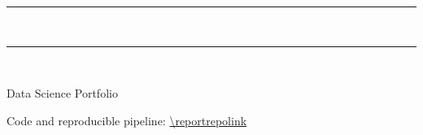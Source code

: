 \begin{titlepage}
    \centering
    \vspace*{2.5cm}

    {\color{accentlight}\rule{\linewidth}{1.4pt}}\\[0.4cm]
    {\Huge\bfseries\color{accent} \reporttitle\par}
    \vspace{0.4cm}
    {\Large\color{muted} \reportsubtitle\par}
    \vspace{0.3cm}
    {\color{accentlight}\rule{\linewidth}{1.4pt}}\\[2cm]

    {\large \reportauthor\par}
    \vspace{0.2cm}
    {\normalsize\color{muted} Data Science Portfolio\par}
    \vspace{0.2cm}
    {\normalsize\color{muted} \reportdate\par}

    \vfill

    \ifx\reportrepolink\empty\else
        {\small\color{muted} Code and reproducible pipeline: \url{\reportrepolink}\par}
    \fi

\end{titlepage}
